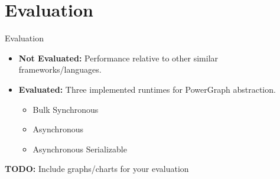 \section{Evaluation}

\begin{frame}{Evaluation}
  \begin{itemize}
    \item \textbf{Not Evaluated:} Performance relative to other similar
          frameworks/languages.
    \item \textbf{Evaluated:} Three implemented runtimes for PowerGraph
          abstraction.
    \begin{itemize}
      \item{Bulk Synchronous}
      \item{Asynchronous}
      \item{Asynchronous Serializable}
    \end{itemize}
  \end{itemize}
\end{frame}

\begin{frame}
  \textbf{TODO:} Include graphs/charts for your evaluation
\end{frame}
